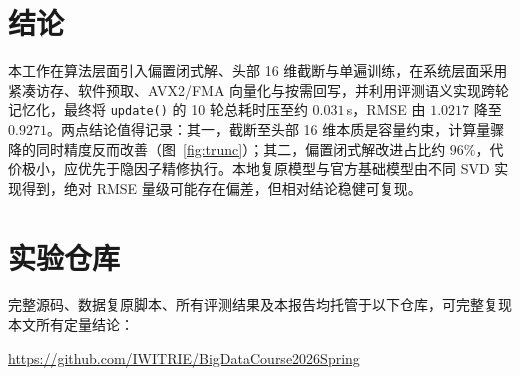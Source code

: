 \documentclass[UTF8,a4paper,10pt]{ctexart}
\newcommand{\xiaosi}{\fontsize{12pt}{20pt}\selectfont}
\newcommand{\nRmseBase}{1.0217}
\newcommand{\nRmseNew}{0.9271}
\newcommand{\nTimeTotalS}{0.031}     %
\newcommand{\nBiasPct}{96}           %
\begin{document}
\section{结论}
\xiaosi

本工作在算法层面引入偏置闭式解、头部 16 维截断与单遍训练，在系统层面采用紧凑访存、软件预取、AVX2/FMA 向量化与按需回写，并利用评测语义实现跨轮记忆化，最终将 \texttt{update()} 的 10 轮总耗时压至约 $\nTimeTotalS$\,s，RMSE 由 $\nRmseBase$ 降至 $\nRmseNew$。两点结论值得记录：其一，截断至头部 16 维本质是容量约束，计算量骤降的同时精度反而改善（图~\ref{fig:trunc}）；其二，偏置闭式解改进占比约 $\nBiasPct\%$，代价极小，应优先于隐因子精修执行。本地复原模型与官方基础模型由不同 SVD 实现得到，绝对 RMSE 量级可能存在偏差，但相对结论稳健可复现。

\section{实验仓库}
\xiaosi

完整源码、数据复原脚本、所有评测结果及本报告均托管于以下仓库，可完整复现本文所有定量结论：

\vspace{4pt}
\noindent\url{https://github.com/IWITRIE/BigDataCourse2026Spring}
\end{document}
